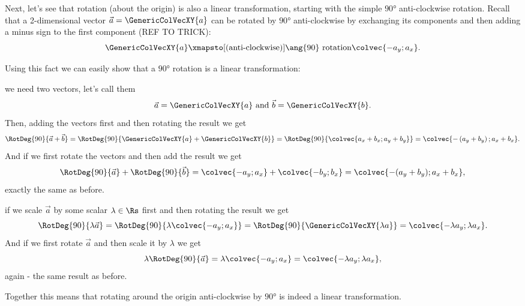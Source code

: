 Next, let's see that rotation (about the origin) is also a linear transformation, starting with the simple $\ang{90}$ anti-clockwise rotation. Recall that a 2-dimensional vector $\vec{a}=\GenericColVecXY{a}$ can be rotated by $\ang{90}$ anti-clockwise by exchanging its components and then adding a minus sign to the first component (REF TO TRICK):
\begin{equation*}
	\GenericColVecXY{a} \xmapsto[\text{(anti-clockwise)}]{\ang{90}\ \text{rotation}} \colvec{-a_{y};a_{x}}.
\end{equation*}

Using this fact we can easily show that a $\ang{90}$ rotation is a linear transformation:
\begin{descitemize}
	\item[Additivity] we need two vectors, let's call them $$\vec{a}=\GenericColVecXY{a}\ \text{and}\ \vec{b}=\GenericColVecXY{b}.$$ Then, adding the vectors first and then rotating the result we get
	\begin{equation*}
		\RotDeg{90}{\vec{a}+\vec{b}} = \RotDeg{90}{\GenericColVecXY{a}+\GenericColVecXY{b}}
		= \RotDeg{90}{\colvec{a_{x}+b_{x};a_{y}+b_{y}}}
		= \colvec{-\left(a_{y}+b_{y}\right);a_{x}+b_{x}}.
	\end{equation*}
	And if we first rotate the vectors and then add the result we get
	\begin{equation*}
		\RotDeg{90}{\vec{a}} + \RotDeg{90}{\vec{b}} = \colvec{-a_{y};a_{x}}+\colvec{-b_{y};b_{x}} = \colvec{-(a_{y}+b_{y});a_{x}+b_{x}},
	\end{equation*}
	exactly the same as before.

	\item[Homogeneity] if we scale $\vec{a}$ by some scalar $\lambda\in\Rs$ first and then rotating the result we get
	\begin{equation*}
		\RotDeg{90}{\lambda\vec{a}} = \RotDeg{90}{\lambda\colvec{-a_{y};a_{x}}} = \RotDeg{90}{\GenericColVecXY{\lambda a}} = \colvec{-\lambda a_{y};\lambda a_{x}}.
	\end{equation*}
	And if we first rotate $\vec{a}$ and then scale it by $\lambda$ we get
	\begin{equation*}
		\lambda \RotDeg{90}{\vec{a}} = \lambda \colvec{-a_{y};a_{x}} = \colvec{-\lambda a_{y};\lambda a_{x}},
	\end{equation*}
	again - the same result as before.
\end{descitemize}
Together this means that rotating around the origin anti-clockwise by $\ang{90}$ is indeed a linear transformation.

